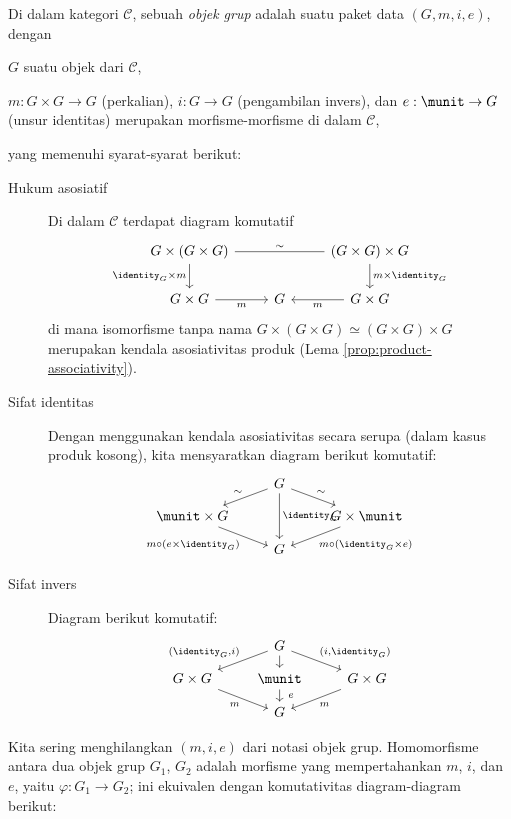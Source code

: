 \begin{definition}\label{def:group-object}
	Di dalam kategori $\mathcal{C}$, sebuah \emph{objek grup} adalah suatu paket data $(G, m, i, e)$, dengan
	\begin{compactitem}
		\item $G$ suatu objek dari $\mathcal{C}$,
		\item $m: G \times G \to G$ (perkalian), $i: G \to G$ (pengambilan invers), dan $e: \munit \to G$ (unsur identitas) merupakan morfisme-morfisme di dalam $\mathcal{C}$,
	\end{compactitem}
	yang memenuhi syarat-syarat berikut:
	\begin{description}
		\item[Hukum asosiatif] Di dalam $\mathcal{C}$ terdapat diagram komutatif
			\[\begin{tikzcd}
				G \times (G \times G) \arrow[dash, rr, "\sim"] \arrow[d, "\identity_G \times m"'] & & (G \times G) \times G \arrow[d, "m \times \identity_G"] \\
				G \times G \arrow[r, "m"'] & G & G \times G \arrow[l, "m"]
			\end{tikzcd}\]
			di mana isomorfisme tanpa nama $G \times (G \times G) \simeq (G \times G) \times G$ merupakan kendala asosiativitas produk (Lema \ref{prop:product-associativity}).
		\item[Sifat identitas] Dengan menggunakan kendala asosiativitas secara serupa (dalam kasus produk kosong), kita mensyaratkan diagram berikut komutatif:
			\[ \begin{tikzcd}[row sep=small]
				{} & G \arrow[ld, "\sim"'] \arrow[rd, "\sim"] \arrow[dd, "\identity_G"] &  \\
				\munit \times G \arrow[rd, "m \circ (e \times \identity_G)"'] & & G \times \munit \arrow[ld, "m \circ(\identity_G \times e)"] \\
				& G &
			\end{tikzcd} \]
		\item[Sifat invers] Diagram berikut komutatif:
			\[ \begin{tikzcd}[row sep=small]
				& G \arrow[ld, "{(\identity_G, i)}"'] \arrow[rd, "{(i, \identity_G)}"] \arrow[d] & \\
				G \times G \arrow[rd, "m"'] & \munit \arrow[d, "e" inner sep=0.6em] & G \times G \arrow[ld, "m"] \\
				& G &
			\end{tikzcd} \]
	\end{description}
	Kita sering menghilangkan $(m, i, e)$ dari notasi objek grup. Homomorfisme antara dua objek grup $G_1$, $G_2$ adalah morfisme yang mempertahankan $m$, $i$, dan $e$, yaitu $\varphi: G_1 \to G_2$; ini ekuivalen dengan komutativitas diagram-diagram berikut:

\end{definition}
